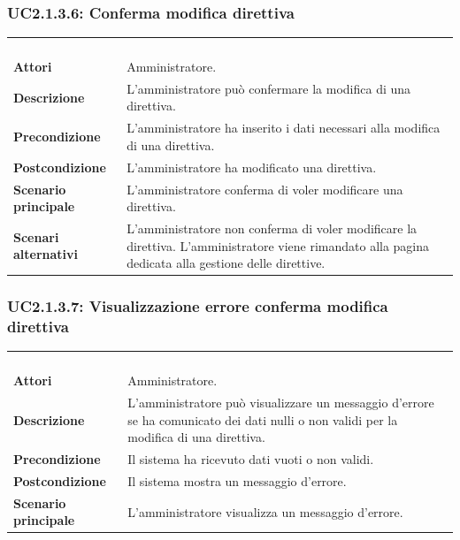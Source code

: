 \subsubsection{UC2.1.3.6: Conferma modifica direttiva}
\label{UC2.1.3.6}
\begin{longtable}{l|p{10cm}}
\rowcolor[gray]{0.8} \multicolumn{2}{c}{} \\
\rowcolor[gray]{0.8} \multicolumn{2}{c}{\textbf{UC2.1.3.6 - Conferma modifica direttiva}} \\
\rowcolor[gray]{0.8} \multicolumn{2}{c}{} \\
\hline
&\\
\textbf{Attori} & Amministratore.\\[7pt]
\textbf{Descrizione} & L'amministratore può confermare la modifica di una direttiva.\\[7pt]
\textbf{Precondizione} & L'amministratore ha inserito i dati necessari alla modifica di una direttiva.\\[7pt]
\textbf{Postcondizione} & L'amministratore ha modificato una direttiva.\\[7pt]
\textbf{Scenario principale} &L'amministratore conferma di voler modificare una direttiva.\\[7pt]
\textbf{Scenari alternativi} & L'amministratore non conferma di voler modificare la direttiva. L'amministratore viene rimandato alla pagina dedicata alla gestione delle direttive.\\[7pt]\hline
\end{longtable}

\subsubsection{UC2.1.3.7: Visualizzazione errore conferma modifica direttiva}
\label{UC2.1.3.7}
\begin{longtable}{l|p{10cm}}
\rowcolor[gray]{0.8} \multicolumn{2}{c}{} \\
\rowcolor[gray]{0.8} \multicolumn{2}{c}{\textbf{UC2.1.3.7 - Visualizzazione errore conferma modifica direttiva}} \\
\rowcolor[gray]{0.8} \multicolumn{2}{c}{} \\
\hline
&\\
\textbf{Attori} & Amministratore.\\[7pt]
\textbf{Descrizione} & L'amministratore può visualizzare un messaggio d'errore se ha comunicato dei dati nulli o non validi per la modifica di una direttiva.\\[7pt]
\textbf{Precondizione} & Il sistema ha ricevuto dati vuoti o non validi.\\[7pt]
\textbf{Postcondizione} & Il sistema mostra un messaggio d'errore.\\[7pt]
\textbf{Scenario principale} &L'amministratore visualizza un messaggio d'errore.\\[7pt]\hline
\end{longtable}

